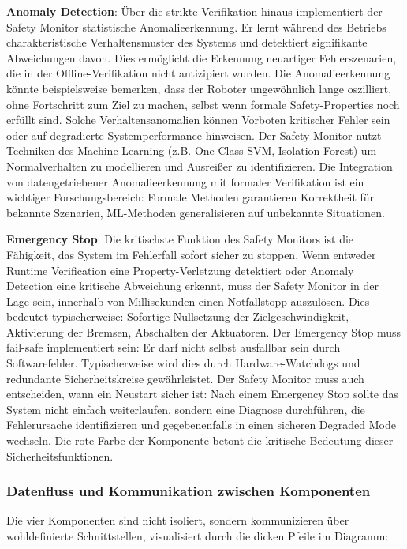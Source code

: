 ﻿\documentclass[a4paper,12pt]{article}
\theoremstyle{definition}
\begin{document}
\textbf{Anomaly Detection}: Über die strikte Verifikation hinaus implementiert der Safety Monitor statistische Anomalieerkennung. Er lernt während des Betriebs charakteristische Verhaltensmuster des Systems und detektiert signifikante Abweichungen davon. Dies ermöglicht die Erkennung neuartiger Fehlerszenarien, die in der Offline-Verifikation nicht antizipiert wurden. Die Anomalieerkennung könnte beispielsweise bemerken, dass der Roboter ungewöhnlich lange oszilliert, ohne Fortschritt zum Ziel zu machen, selbst wenn formale Safety-Properties noch erfüllt sind. Solche Verhaltensanomalien können Vorboten kritischer Fehler sein oder auf degradierte Systemperformance hinweisen. Der Safety Monitor nutzt Techniken des Machine Learning (z.B. One-Class SVM, Isolation Forest) um Normalverhalten zu modellieren und Ausreißer zu identifizieren. Die Integration von datengetriebener Anomalieerkennung mit formaler Verifikation ist ein wichtiger Forschungsbereich: Formale Methoden garantieren Korrektheit für bekannte Szenarien, ML-Methoden generalisieren auf unbekannte Situationen.

\textbf{Emergency Stop}: Die kritischste Funktion des Safety Monitors ist die Fähigkeit, das System im Fehlerfall sofort sicher zu stoppen. Wenn entweder Runtime Verification eine Property-Verletzung detektiert oder Anomaly Detection eine kritische Abweichung erkennt, muss der Safety Monitor in der Lage sein, innerhalb von Millisekunden einen Notfallstopp auszulösen. Dies bedeutet typischerweise: Sofortige Nullsetzung der Zielgeschwindigkeit, Aktivierung der Bremsen, Abschalten der Aktuatoren. Der Emergency Stop muss fail-safe implementiert sein: Er darf nicht selbst ausfallbar sein durch Softwarefehler. Typischerweise wird dies durch Hardware-Watchdogs und redundante Sicherheitskreise gewährleistet. Der Safety Monitor muss auch entscheiden, wann ein Neustart sicher ist: Nach einem Emergency Stop sollte das System nicht einfach weiterlaufen, sondern eine Diagnose durchführen, die Fehlerursache identifizieren und gegebenenfalls in einen sicheren Degraded Mode wechseln. Die rote Farbe der Komponente betont die kritische Bedeutung dieser Sicherheitsfunktionen.

\subsubsection{Datenfluss und Kommunikation zwischen Komponenten}

Die vier Komponenten sind nicht isoliert, sondern kommunizieren über wohldefinierte Schnittstellen, visualisiert durch die dicken Pfeile im Diagramm:
\end{document}
